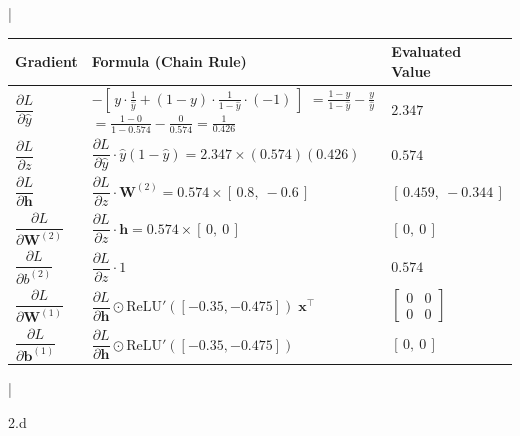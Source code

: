 \begin{answer}
  \medskip
  \begin{table}[H]
  \centering
  \lstDeleteShortInline|
  \begin{tabular}{|l|p{8.5cm}|l|}
  \hline
  Gradient & Formula (Chain Rule) & Evaluated Value \\
  \hline
  $\dfrac{\partial L}{\partial \hat{y}}$ &
    $-\left[\, y \cdot \frac{1}{\hat{y}} + (1-y) \cdot \frac{1}{1-\hat{y}} \cdot (-1) \,\right]$ \newline
    $= \frac{1-y}{1-\hat{y}} - \frac{y}{\hat{y}}$ \newline
    $= \frac{1-0}{1-0.574} - \frac{0}{0.574} = \frac{1}{0.426}$
    & $2.347$ \\
  \hline
  $\dfrac{\partial L}{\partial z}$ &
    $\dfrac{\partial L}{\partial \hat{y}} \cdot \hat{y}(1-\hat{y})
     = 2.347 \times (0.574)(0.426)$ & $0.574$ \\
  \hline
  $\dfrac{\partial L}{\partial \mathbf{h}}$ &
    $\dfrac{\partial L}{\partial z} \cdot \mathbf{W}^{(2)}
     = 0.574 \times [\,0.8,\ -0.6\,]$ & $[\,0.459,\ -0.344\,]$ \\
  \hline
  $\dfrac{\partial L}{\partial \mathbf{W}^{(2)}}$ &
    $\dfrac{\partial L}{\partial z} \cdot \mathbf{h} = 0.574 \times [\,0,\ 0\,]$
    & $[\,0,\ 0\,]$ \\
  \hline
  $\dfrac{\partial L}{\partial b^{(2)}}$ &
    $\dfrac{\partial L}{\partial z} \cdot 1$ & $0.574$ \\
  \hline
  $\dfrac{\partial L}{\partial \mathbf{W}^{(1)}}$ &
    $\dfrac{\partial L}{\partial \mathbf{h}} \odot \text{ReLU}'([-0.35, -0.475])
     \; \mathbf{x}^{\top}$
    & $\begin{bmatrix} 0 & 0 \\ 0 & 0 \end{bmatrix}$ \\
  \hline
  $\dfrac{\partial L}{\partial \mathbf{b}^{(1)}}$ &
    $\dfrac{\partial L}{\partial \mathbf{h}} \odot \text{ReLU}'([-0.35, -0.475])$
    & $[\,0,\ 0\,]$ \\
  \hline
  \end{tabular}
  \lstMakeShortInline|
  \end{table}

\end{answer}


\LARGE
2.d
\normalsize

